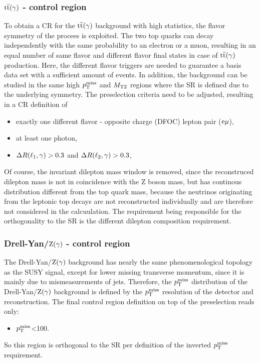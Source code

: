 \subsubsection*{${\mathrm{t}\overline{\mathrm{t}}}(\gamma)$ - control region}
To obtain a CR for the ${\mathrm{t}\overline{\mathrm{t}}}(\gamma)$ background with high statistics, the flavor symmetry of the procees is exploited. The two top quarks can decay independently with the same probability to an electron or a muon, resulting in an equal number of same flavor and different flavor final states in case of ${\mathrm{t}\overline{\mathrm{t}}}(\gamma)$ production. Here, the different flavor triggers are needed to guarantee a basis data set with a sufficient amount of events. In addition, the background can be studied in the same high $p_{\mathrm{T}}^\text{miss}$ and $M_{\mathrm{T2}}$ regions where the SR is defined due to the underlying symmetry. The preselection criteria need to be adjusted, resulting in a CR definition of
\begin{itemize}
 \item exactly one different flavor - opposite charge (DFOC) lepton pair ($\mathrm{e}{\mu}$),
 \item at least one photon,
 \item $\Delta R(\ell_1,\gamma)>0.3$ and $\Delta R(\ell_2,\gamma)>0.3$,
\end{itemize}
Of course, the invariant dilepton mass window is removed, since the reconstruced dilepton mass is not in coincidence with the Z boson mass, but has continous distribution different from the top quark mass, because the neutrinos originating from the leptonic top decays are not reconstructed individually and are therefore not considered in the calcuulation. The requirement being responsible for the orthogonality to the SR is the different dilepton composition requirement.
\subsubsection*{Drell-Yan/$\mathrm{Z}(\gamma)$ - control region}
The Drell-Yan/$\mathrm{Z}(\gamma)$ background has nearly the same phenomenological topology as the SUSY signal, except for lower missing transverse momentum, since it is mainly due to mismeasurements of jets. Therefore, the $p_{\mathrm{T}}^\text{miss}$ distribution of the Drell-Yan/$\mathrm{Z}(\gamma)$ background is defined by the $p_{\mathrm{T}}^\text{miss}$ resolution of the detector and reconstruction. The final control region definition on top of the preselection reads only:
\begin{itemize}
 \item $p_{\mathrm{T}}^\text{miss}$<100\GeV.
\end{itemize}
So this region is orthogonal to the SR per definition of the inverted $p_{\mathrm{T}}^\text{miss}$ requirement.
